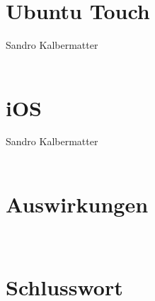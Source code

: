 \documentclass[a4paper,10pt,titlepage,twoside]{article}
\begin{document}
\begin{multicols*}{2}
		\section{Ubuntu Touch}
		{\scriptsize Sandro Kalbermatter}\\
		{\normalsize \mbox{}}\\
		
		\newline
		\newline
		
		\section{iOS}
		{\scriptsize Sandro Kalbermatter}\\
		{\normalsize \mbox{}}\\
		
		\pagebreak
		
		\section {Auswirkungen}
		{\normalsize \mbox{}}\\
		
		\newline
		\newline
				
		\section{Schlusswort}
		
		\pagebreak
		
		\printbibliography
	\end{multicols*}
\end{document}
